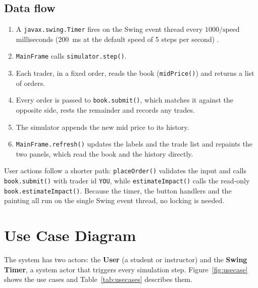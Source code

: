 \documentclass[12pt,a4paper,openany,oneside]{report}
\newcommand{\code}[1]{\texttt{#1}}
\begin{document}
\subsection*{Data flow}
\begin{enumerate}
  \item A \code{javax.swing.Timer} fires on the Swing event thread every $1000/\text{speed}$ milliseconds (200~ms at the default speed of 5 steps per second) \cite{timerapi}.
  \item \code{MainFrame} calls \code{simulator.step()}.
  \item Each trader, in a fixed order, reads the book (\code{midPrice()}) and returns a list of orders.
  \item Every order is passed to \code{book.submit()}, which matches it against the opposite side, rests the remainder and records any trades.
  \item The simulator appends the new mid price to its history.
  \item \code{MainFrame.refresh()} updates the labels and the trade list and repaints the two panels, which read the book and the history directly.
\end{enumerate}
User actions follow a shorter path: \code{placeOrder()} validates the input and calls \code{book.submit()} with trader id \code{YOU}, while \code{estimateImpact()} calls the read-only \code{book.estimateImpact()}. Because the timer, the button handlers and the painting all run on the single Swing event thread, no locking is needed.

\section{Use Case Diagram}

The system has two actors: the \textbf{User} (a student or instructor) and the \textbf{Swing Timer}, a system actor that triggers every simulation step. Figure~\ref{fig:usecase} shows the use cases and Table~\ref{tab:usecases} describes them.
\end{document}
